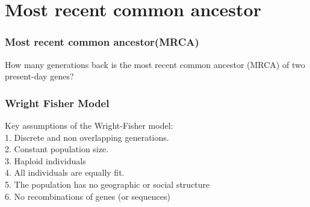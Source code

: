 \documentclass{beamer}
\begin{document}
    \section{Most recent common ancestor}
    \begin{frame}
        \frametitle{Most recent common ancestor(MRCA)}
        How many generations back is the most recent common ancestor (MRCA) of two present-day genes?
    \end{frame}

    \begin{frame}
        \frametitle{Wright Fisher Model}
        Key assumptions of the Wright-Fisher model: \\
        1. Discrete and non overlapping generations. \\
        2. Constant population size. \\
        3. Haploid individuals \\
        4. All individuals are equally fit. \\
        5. The population has no geographic or social structure\\
        6. No recombinations of genes (or sequences)



    
        
    
    \end{frame}
\end{document}
